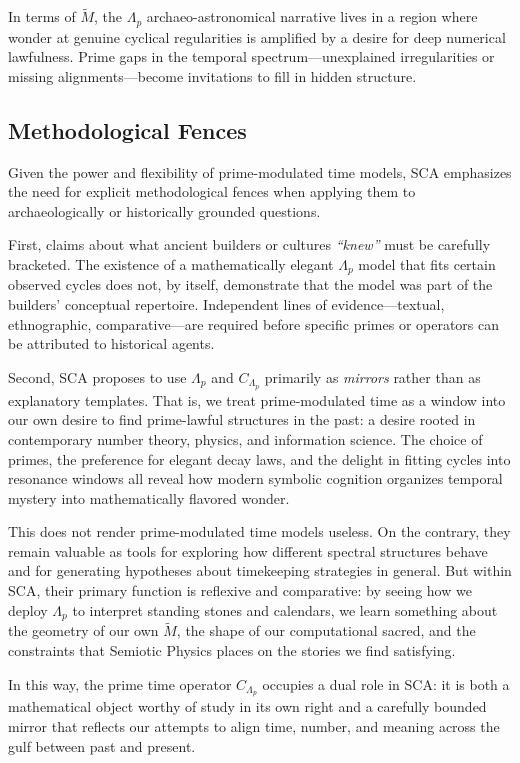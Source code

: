 \documentclass[12]{amsart}
\theoremstyle{plain}
\begin{document}
In terms of $\tilde M$, the $\Lambda_p$ archaeo-astronomical narrative lives in a region where wonder at genuine cyclical regularities is amplified by a desire for deep numerical lawfulness. Prime gaps in the temporal spectrum—unexplained irregularities or missing alignments—become invitations to fill in hidden structure.

\subsection{Methodological Fences}

Given the power and flexibility of prime-modulated time models, SCA emphasizes the need for explicit methodological fences when applying them to archaeologically or historically grounded questions.

First, claims about what ancient builders or cultures \emph{``knew''} must be carefully bracketed. The existence of a mathematically elegant $\Lambda_p$ model that fits certain observed cycles does not, by itself, demonstrate that the model was part of the builders' conceptual repertoire. Independent lines of evidence---textual, ethnographic, comparative---are required before specific primes or operators can be attributed to historical agents.

Second, SCA proposes to use $\Lambda_p$ and $C_{\Lambda_p}$ primarily as \emph{mirrors} rather than as explanatory templates. That is, we treat prime-modulated time as a window into our own desire to find prime-lawful structures in the past: a desire rooted in contemporary number theory, physics, and information science. The choice of primes, the preference for elegant decay laws, and the delight in fitting cycles into resonance windows all reveal how modern symbolic cognition organizes temporal mystery into mathematically flavored wonder.

This does not render prime-modulated time models useless. On the contrary, they remain valuable as tools for exploring how different spectral structures behave and for generating hypotheses about timekeeping strategies in general. But within SCA, their primary function is reflexive and comparative: by seeing how we deploy $\Lambda_p$ to interpret standing stones and calendars, we learn something about the geometry of our own $\tilde M$, the shape of our computational sacred, and the constraints that Semiotic Physics places on the stories we find satisfying.

In this way, the prime time operator $C_{\Lambda_p}$ occupies a dual role in SCA: it is both a mathematical object worthy of study in its own right and a carefully bounded mirror that reflects our attempts to align time, number, and meaning across the gulf between past and present.
\end{document}
